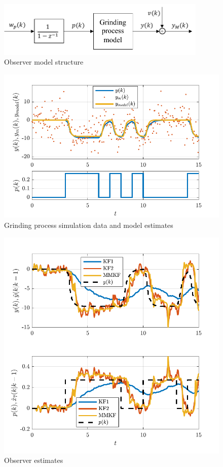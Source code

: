 \begin{figure}[htp]
	\centering
	\includegraphics[width=10cm]{images/obs-model-diag.pdf}
	\caption{Observer model structure}
	\label{fig:obs_model}
\end{figure}

\begin{figure}[htp]
	\centering
	\includegraphics[width=12cm]{images/rod_obs_sim_1_ioplot_P2DcTd4.pdf}
	\caption{Grinding process simulation data and model estimates}
	\label{fig:rod_obs_sim_1_ioplot_P2DcTd4}
\end{figure}

\begin{figure}[htp]
	\centering
	\includegraphics[width=12cm]{images/rod_obs_sim_1_est_P2DcTd4.pdf}
	\caption{Observer estimates}
	\label{fig:rod_obs_sim_1_est_P2DcTd4}
\end{figure}

